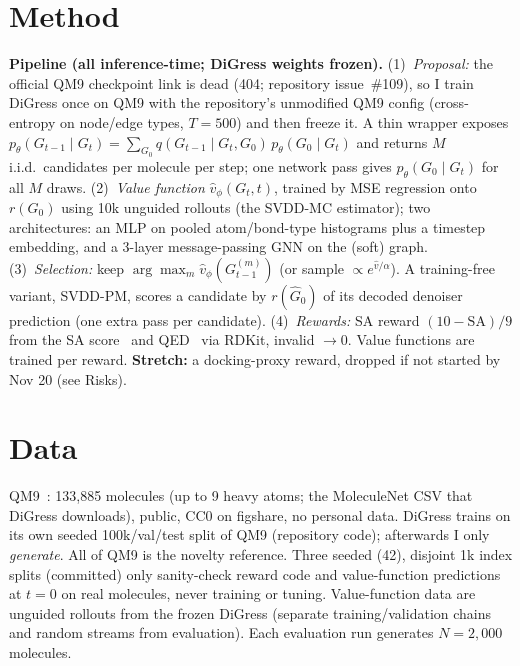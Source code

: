 \documentclass[10pt]{article}
\newcommand{\Gt}{G_t}
\begin{document}
\section{Method}
\textbf{Pipeline (all inference-time; DiGress weights frozen).} (1)~\emph{Proposal:} the official QM9 checkpoint link is dead (404; repository issue~\#109), so I train DiGress once on QM9 with the repository's unmodified QM9 config (cross-entropy on node/edge types, $T{=}500$) and then freeze it. A thin wrapper exposes $p_\theta(G_{t-1}\mid\Gt)=\sum_{G_0}q(G_{t-1}\mid\Gt,G_0)\,p_\theta(G_0\mid\Gt)$ and returns $M$ i.i.d.\ candidates per molecule per step; one network pass gives $p_\theta(G_0\mid\Gt)$ for all $M$ draws. (2)~\emph{Value function} $\hat v_\phi(\Gt,t)$, trained by MSE regression onto $r(G_0)$ using 10k unguided rollouts (the SVDD-MC estimator); two architectures: an MLP on pooled atom/bond-type histograms plus a timestep embedding, and a 3-layer message-passing GNN on the (soft) graph. (3)~\emph{Selection:} keep $\arg\max_m \hat v_\phi(G_{t-1}^{(m)})$ (or sample $\propto e^{\hat v/\alpha}$). A training-free variant, SVDD-PM, scores a candidate by $r(\hat G_0)$ of its decoded denoiser prediction (one extra pass per candidate). (4)~\emph{Rewards:} SA reward $(10-\mathrm{SA})/9$ from the SA score~\cite{ertl2009sa} and QED~\cite{bickerton2012qed} via RDKit, invalid $\to 0$. Value functions are trained per reward. \textbf{Stretch:} a docking-proxy reward, dropped if not started by Nov 20 (see Risks).

\section{Data}
QM9~\cite{ramakrishnan2014qm9}: 133{,}885 molecules (up to 9 heavy atoms; the MoleculeNet CSV that DiGress downloads), public, CC0 on figshare, no personal data. DiGress trains on its own seeded 100k/val/test split of QM9 (repository code); afterwards I only \emph{generate}. All of QM9 is the novelty reference. Three seeded (42), disjoint 1k index splits (committed) only sanity-check reward code and value-function predictions at $t{=}0$ on real molecules, never training or tuning. Value-function data are unguided rollouts from the frozen DiGress (separate training/validation chains and random streams from evaluation). Each evaluation run generates $N{=}2{,}000$ molecules.
\end{document}
